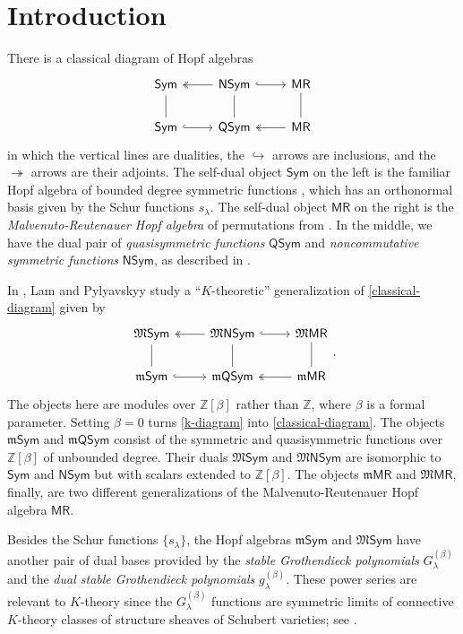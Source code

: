 \documentclass[11pt]{article}
\theoremstyle{definition}
\numberwithin{equation}{section}
\numberwithin{equation}{section}
\newcommand{\ZZ}{\mathbb{Z}}
\newcommand{\be}{\begin{equation}}
\newcommand{\ee}{\end{equation}}
\newcommand{\Sym}{\mathsf{Sym}}
\newcommand{\NSym}{\mathsf{NSym}}
\newcommand{\MPR}{\mathsf{MR}}
\newcommand{\QSym}{\mathsf{QSym}}
\newcommand{\MSym}{\mathfrak{M}\mathsf{Sym}}
\newcommand{\MNSym}{\mathfrak{M}\mathsf{NSym}}
\newcommand{\MMPR}{\mathfrak{M}\mathsf{MR}}
\newcommand{\mMPR}{\mathfrak{m}\mathsf{MR}}
\newcommand{\mSym}{\mathfrak{m}\mathsf{Sym}}
\newcommand{\mQSym}{\mathfrak{m}\mathsf{QSym}}
\newcommand{\defn}[1]{{\color{darkred}\emph{#1}}}
\begin{document}
\section{Introduction}

There is a classical diagram of Hopf algebras
\be\label{classical-diagram}
\begin{tikzcd}
\Sym \arrow[d, dash] & \NSym \arrow[l, twoheadrightarrow] \arrow[d, dash]  \arrow[r, hook] & \MPR \arrow[d, dash] \\
\Sym \arrow[r,hook] & \QSym  & \MPR  \arrow[l,twoheadrightarrow]
\end{tikzcd}
\ee
in which  the vertical lines are dualities, the $\hookrightarrow$ arrows are inclusions, and 
the $\twoheadrightarrow$ arrows are their adjoints.
The self-dual object $\Sym$ on the left is the familiar Hopf algebra 
of bounded degree symmetric functions \cite[\S2]{GrinbergReiner}, which has an orthonormal basis given by the  Schur functions $s_\lambda$.
The self-dual object $\MPR$ on the right is the \defn{Malvenuto-Reutenauer Hopf algebra}
of permutations from \cite{AguiarSottile,Malvenuto}.
In the middle, we have the dual pair of \defn{quasisymmetric functions} $\QSym$
and \defn{noncommutative symmetric functions} $\NSym$, as described in \cite[\S5]{GrinbergReiner}.

In \cite{LamPyl}, Lam and Pylyavskyy  study a ``$K$-theoretic'' generalization of \eqref{classical-diagram} 
given by 
\be\label{k-diagram}
\begin{tikzcd}
\MSym \arrow[d, dash] & \MNSym \arrow[l, twoheadrightarrow] \arrow[d, dash]  \arrow[r, hook] & \MMPR \arrow[d, dash] \\
\mSym \arrow[r,hook] & \mQSym  & \mMPR  \arrow[l,twoheadrightarrow]
\end{tikzcd}.
\ee
The objects here are modules over $\ZZ[\beta]$ rather than $\ZZ$, where $\beta$ is a formal parameter. Setting $\beta=0$ turns \eqref{k-diagram} into \eqref{classical-diagram}.
The objects $\mSym$ and $\mQSym$ consist of the symmetric and quasisymmetric functions over $\ZZ[\beta]$
of unbounded degree. 
Their duals $\MSym$ and $\MNSym$ are isomorphic to $\Sym$ and $\NSym$ but with scalars extended to $\ZZ[\beta]$.
The objects $\mMPR$ and $\MMPR$, finally, are two different generalizations of 
the Malvenuto-Reutenauer Hopf algebra $
\MPR$.

Besides the Schur functions $\{s_\lambda\}$, the Hopf algebras $\mSym$ and $\MSym$
have another pair of dual bases provided by the \defn{stable Grothendieck polynomials}
$G^{(\beta)}_\lambda$ and the \defn{dual stable Grothendieck polynomials} $g^{(\beta)}_\lambda$.
These power series are relevant to $K$-theory since the $G^{(\beta)}_\lambda$ functions are symmetric limits of connective $K$-theory classes of structure sheaves of Schubert varieties; see \cite{Buch2002,FominKirillov94}.
\end{document}
